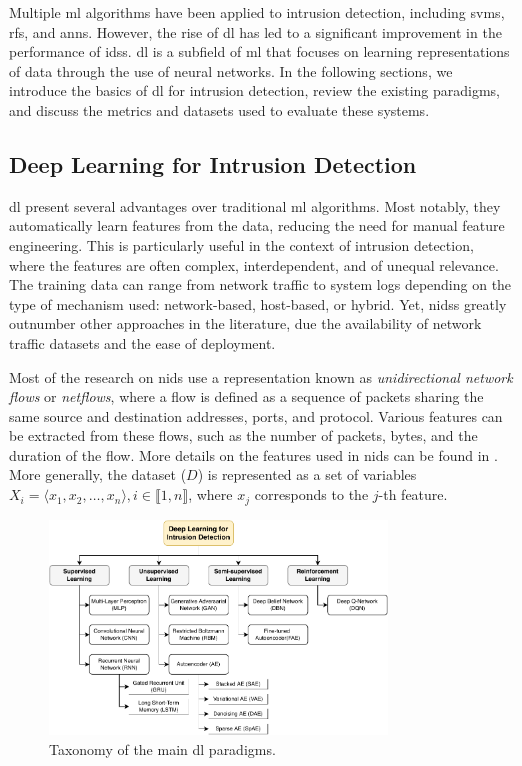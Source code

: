 Multiple \gls{ml} algorithms have been applied to intrusion detection, including \glspl{svm}, \glspl{rf}, and \glspl{ann}.
However, the rise of \gls{dl} has led to a significant improvement in the performance of \glspl{ids}.
\Gls{dl} is a subfield of \gls{ml} that focuses on learning representations of data through the use of neural networks.
In the following sections, we introduce the basics of \gls{dl} for intrusion detection, review the existing paradigms, and discuss the metrics and datasets used to evaluate these systems.


\subsection{Deep Learning for Intrusion Detection\label{sec:bg.ids.dl}}

\Gls{dl} present several advantages over traditional \gls{ml} algorithms.
Most notably, they automatically learn features from the data, reducing the need for manual feature engineering.
This is particularly useful in the context of intrusion detection, where the features are often complex, interdependent, and of unequal relevance.
The training data can range from network traffic to system logs depending on the type of mechanism used: network-based, host-based, or hybrid.
Yet, \glspl{nids} greatly outnumber other approaches in the literature, due the availability of network traffic datasets and the ease of deployment.

Most of the research on \gls{nids} use a representation known as \emph{unidirectional network flows} or \emph{netflows}, where a flow is defined as a sequence of packets sharing the same source and destination addresses, ports, and protocol.
Various features can be extracted from these flows, such as the number of packets, bytes, and the duration of the flow.
More details on the features used in \gls{nids} can be found in .
More generally, the dataset ($D$) is represented as a set of variables $X_i = \langle x_1, x_2, \ldots, x_n \rangle, i \in \llbracket 1, n \rrbracket $, where $x_j$ corresponds to the $j$-th feature.

\begin{figure}
  \centering
  \includegraphics[width=0.8\textwidth]{figures/ml-taxonomy.pdf}
  \caption{
    Taxonomy of the main \gls{dl} paradigms.
    \label{fig:bg.taxonomy}
  }
\end{figure}

